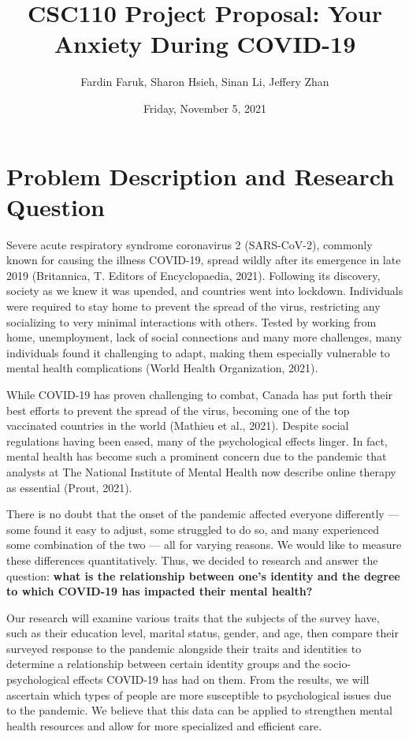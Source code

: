 \documentclass[fontsize=11pt]{article}
\title{CSC110 Project Proposal: Your Anxiety During COVID-19}
\author{Fardin Faruk, Sharon Hsieh, Sinan Li, Jeffery Zhan}
\date{Friday, November 5, 2021}
\begin{document}
    \maketitle

    \section*{Problem Description and Research Question}

    Severe acute respiratory syndrome coronavirus 2 (SARS-CoV-2), commonly known for causing the illness COVID-19, spread wildly after its emergence in late 2019 (Britannica, T. Editors of Encyclopaedia, 2021). Following its discovery, society as we knew it was upended, and countries went into lockdown. Individuals were required to stay home to prevent the spread of the virus, restricting any socializing to very minimal interactions with others. Tested by working from home, unemployment, lack of social connections and many more challenges, many individuals found it challenging to adapt, making them especially vulnerable to mental health complications (World Health Organization, 2021).

    While COVID-19 has proven challenging to combat, Canada has put forth their best efforts to prevent the spread of the virus, becoming one of the top vaccinated countries in the world (Mathieu et al., 2021). Despite social regulations having been eased, many of the psychological effects linger. In fact, mental health has become such a prominent concern due to the pandemic that analysts at The National Institute of Mental Health now describe online therapy as essential (Prout, 2021).

    There is no doubt that the onset of the pandemic affected everyone differently — some found it easy to adjust, some struggled to do so, and many experienced some combination of the two — all for varying reasons. We would like to measure these differences quantitatively. Thus, we decided to research and answer the question: \textbf{what is the relationship between one’s identity and the degree to which COVID-19 has impacted their mental health?}

    Our research will examine various traits that the subjects of the survey have, such as their education level, marital status, gender, and age, then compare their surveyed response to the pandemic alongside their traits and identities to determine a relationship between certain identity groups and the socio-psychological effects COVID-19 has had on them. From the results, we will ascertain which types of people are more susceptible to psychological issues due to the pandemic. We believe that this data can be applied to strengthen mental health resources and allow for more specialized and efficient care.
\end{document}
